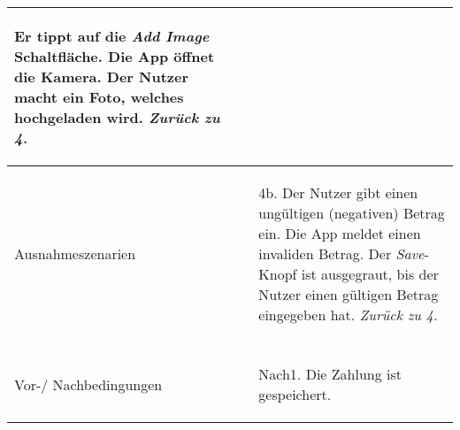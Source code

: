 \begin{table}[H]
\begin{tabularx}{0.95\textwidth}{ |l|X| }
\begin{enumerate}
				                                         \subitem[4a1.] Er tippt auf die \emph{Add Image} Schaltfläche.
				                                         \subitem[4a2.] Die App öffnet die Kamera.
				                                         \subitem[4a3.] Der Nutzer macht ein Foto, welches hochgeladen wird. \emph{Zurück zu 4.}
		                                         \end{enumerate}                                       \\
		\hline
		Ausnahmeszenarien                      & \begin{enumerate}
			                                         \item[4b.] Der Nutzer gibt einen ungültigen (negativen) Betrag ein.
				                                         \subitem[4b1.] Die App meldet einen invaliden Betrag.
				                                         \subitem[4a2.] Der \emph{Save}-Knopf ist ausgegraut, bis der Nutzer einen gültigen Betrag eingegeben hat. \emph{Zurück zu 4.}
		                                         \end{enumerate} \\
		\hline
		\rowcolor{lightgray}                   &                                                                                                                              \\
		\hline
		Vor-/ Nachbedingungen                  & \begin{enumerate}
			                                         \item[Nach1.] Die Zahlung ist gespeichert.
		                                         \end{enumerate}                                                                                    \\
		\hline
	\end{tabularx}
\end{table}


